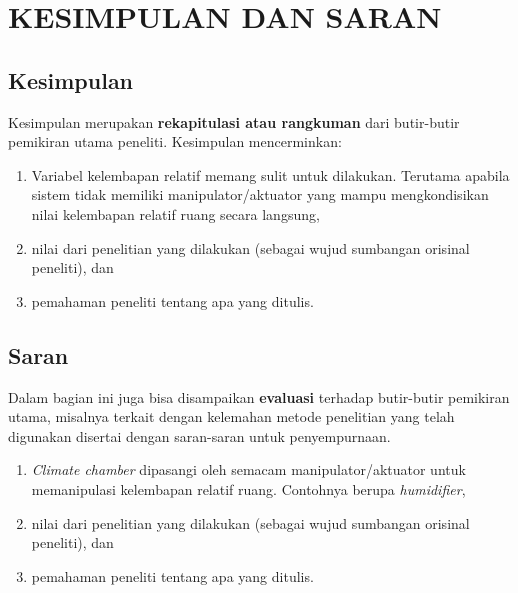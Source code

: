 \chapter{KESIMPULAN DAN SARAN}
\label{kesimpulan-dan-saran}



\section{Kesimpulan}


Kesimpulan merupakan \textbf{rekapitulasi atau rangkuman} dari butir-butir pemikiran utama peneliti. Kesimpulan mencerminkan:
 \begin{enumerate}
 	\item Variabel kelembapan relatif memang sulit untuk dilakukan. Terutama apabila sistem tidak memiliki manipulator/aktuator yang mampu mengkondisikan nilai kelembapan relatif ruang secara langsung,
 	\item nilai dari penelitian yang dilakukan (sebagai wujud sumbangan orisinal peneliti), dan
 	\item pemahaman peneliti tentang apa yang ditulis.
 \end{enumerate}
 


\section{Saran}

Dalam bagian ini juga bisa disampaikan \textbf{evaluasi} terhadap butir-butir pemikiran utama, misalnya terkait dengan kelemahan metode penelitian yang telah digunakan disertai dengan saran-saran untuk penyempurnaan.
\begin{enumerate}
	\item \textit{Climate chamber} dipasangi oleh semacam manipulator/aktuator untuk memanipulasi kelembapan relatif ruang. Contohnya berupa \textit{humidifier},
	\item nilai dari penelitian yang dilakukan (sebagai wujud sumbangan orisinal peneliti), dan
	\item pemahaman peneliti tentang apa yang ditulis.
\end{enumerate}

